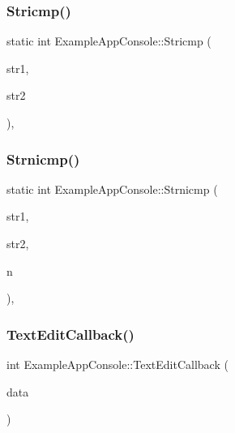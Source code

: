 \subsubsection{\texorpdfstring{Stricmp()}{Stricmp()}}
{\footnotesize\ttfamily static int Example\+App\+Console\+::\+Stricmp (\begin{DoxyParamCaption}\item[{const char $\ast$}]{str1,  }\item[{const char $\ast$}]{str2 }\end{DoxyParamCaption})\hspace{0.3cm}{\ttfamily [inline]}, {\ttfamily [static]}}

\mbox{\label{struct_example_app_console_a11bcb7a4b801e5eeb0c098c082fedc25}} 
\subsubsection{\texorpdfstring{Strnicmp()}{Strnicmp()}}
{\footnotesize\ttfamily static int Example\+App\+Console\+::\+Strnicmp (\begin{DoxyParamCaption}\item[{const char $\ast$}]{str1,  }\item[{const char $\ast$}]{str2,  }\item[{int}]{n }\end{DoxyParamCaption})\hspace{0.3cm}{\ttfamily [inline]}, {\ttfamily [static]}}

\mbox{\label{struct_example_app_console_aae97c81ddab660e6e0296c21844c4a7b}} 
\subsubsection{\texorpdfstring{Text\+Edit\+Callback()}{TextEditCallback()}}
{\footnotesize\ttfamily int Example\+App\+Console\+::\+Text\+Edit\+Callback (\begin{DoxyParamCaption}\item[{\mbox{\hyperlink{struct_im_gui_text_edit_callback_data}{Im\+Gui\+Text\+Edit\+Callback\+Data}} $\ast$}]{data }\end{DoxyParamCaption})\hspace{0.3cm}{\ttfamily [inline]}}

